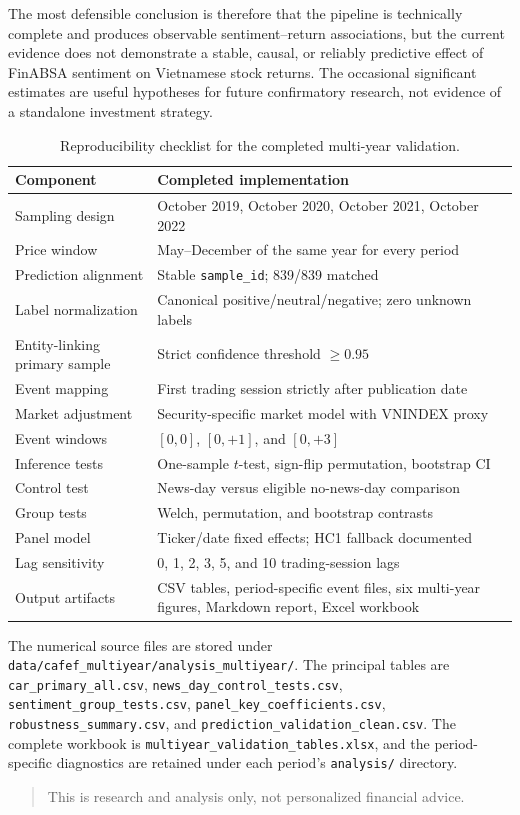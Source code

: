 The most defensible conclusion is therefore that the pipeline is technically complete and produces observable sentiment--return associations, but the current evidence does not demonstrate a stable, causal, or reliably predictive effect of FinABSA sentiment on Vietnamese stock returns. The occasional significant estimates are useful hypotheses for future confirmatory research, not evidence of a standalone investment strategy.

\begin{table}[htbp]
\centering
\small
\caption{Reproducibility checklist for the completed multi-year validation.}
\label{tab:reproducibility-multi-year}
\begin{tabular}{p{}p{}}
\toprule
\textbf{Component} & \textbf{Completed implementation} \\
\midrule
Sampling design & October 2019, October 2020, October 2021, October 2022 \\
Price window & May--December of the same year for every period \\
Prediction alignment & Stable \texttt{sample\_id}; 839/839 matched \\
Label normalization & Canonical positive/neutral/negative; zero unknown labels \\
Entity-linking primary sample & Strict confidence threshold $\geq 0.95$ \\
Event mapping & First trading session strictly after publication date \\
Market adjustment & Security-specific market model with VNINDEX proxy \\
Event windows & $[0,0]$, $[0,+1]$, and $[0,+3]$ \\
Inference tests & One-sample $t$-test, sign-flip permutation, bootstrap CI \\
Control test & News-day versus eligible no-news-day comparison \\
Group tests & Welch, permutation, and bootstrap contrasts \\
Panel model & Ticker/date fixed effects; HC1 fallback documented \\
Lag sensitivity & 0, 1, 2, 3, 5, and 10 trading-session lags \\
Output artifacts & CSV tables, period-specific event files, six multi-year figures, Markdown report, Excel workbook \\
\bottomrule
\end{tabular}
\end{table}

The numerical source files are stored under \texttt{data/cafef\_multiyear/analysis\_multiyear/}. The principal tables are \texttt{car\_primary\_all.csv}, \texttt{news\_day\_control\_tests.csv}, \texttt{sentiment\_group\_tests.csv}, \texttt{panel\_key\_coefficients.csv}, \texttt{robustness\_summary.csv}, and \texttt{prediction\_validation\_clean.csv}. The complete workbook is \texttt{multiyear\_validation\_tables.xlsx}, and the period-specific diagnostics are retained under each period's \texttt{analysis/} directory.

\begin{quote}
This is research and analysis only, not personalized financial advice.
\end{quote}
